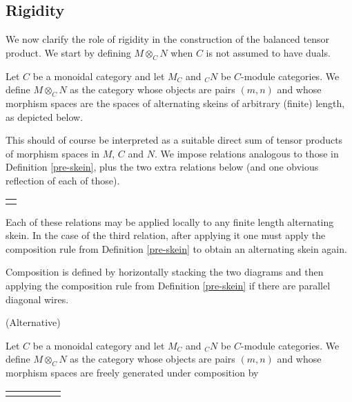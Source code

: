 \subsection{Rigidity}

We now clarify the role of rigidity in the construction of the balanced tensor product. We start by defining $M\otimes_C N$ when $C$ is not assumed to have duals.

\begin{definition}\label{pre-skein_no-duals}

Let $C$ be a monoidal category and let $M_C$ and $_{C}N$ be $C$-module categories. We define $M\otimes_C N$ as the category whose objects are pairs $(m,n)$ and whose morphism spaces are the spaces of alternating skeins of arbitrary (finite) length, as depicted below.

\begin{center}\end{center}
This should of course be interpreted as a suitable direct sum of tensor products of morphism spaces in $M$, $C$ and $N$. We impose relations analogous to those in Definition \ref{pre-skein}, plus the two extra relations below (and one obvious reflection of each of those).


\begin{center}\begin{tabular}{l}
 \\
 \\

\end{tabular}\end{center} Each of these relations may be applied locally to any finite length alternating skein. In the case of the third relation, after applying it one must apply the composition rule from Definition \ref{pre-skein} to obtain an alternating skein again.

Composition is defined by horizontally stacking the two diagrams and then applying the composition rule from Definition \ref{pre-skein} if there are parallel diagonal wires.\end{definition}

\begin{definition}(Alternative)
 
\end{definition}
Let $C$ be a monoidal category and let $M_C$ and $_{C}N$ be $C$-module categories. We define $M\otimes_C N$ as the category whose objects are pairs $(m,n)$ and whose morphism spaces are freely generated under composition by 
\begin{center}
\begin{tabular}{lllll}
 &  &  &  &  
\end{tabular}
\end{center}

